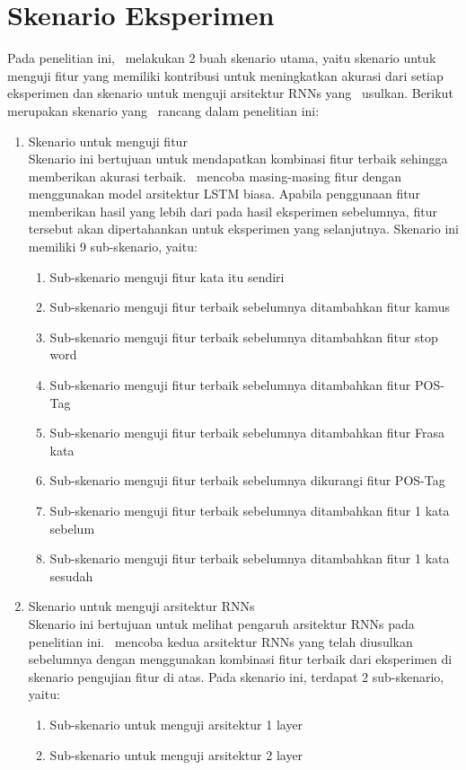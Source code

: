 \section{Skenario Eksperimen}
Pada penelitian ini, \saya~melakukan 2 buah skenario utama, yaitu skenario untuk menguji fitur yang memiliki kontribusi untuk meningkatkan akurasi dari setiap eksperimen dan skenario untuk menguji arsitektur RNNs yang \saya~usulkan. Berikut merupakan skenario yang \saya~rancang dalam penelitian ini:
\begin{enumerate}
	\item Skenario untuk menguji fitur\\
	Skenario ini bertujuan untuk mendapatkan kombinasi fitur terbaik sehingga memberikan akurasi terbaik. \Saya~mencoba masing-masing fitur dengan menggunakan model arsitektur LSTM biasa. Apabila penggunaan fitur memberikan hasil yang lebih dari pada hasil eksperimen sebelumnya, fitur tersebut akan dipertahankan untuk eksperimen yang selanjutnya. Skenario ini memiliki 9 sub-skenario, yaitu:
	\begin{enumerate}
		\item Sub-skenario menguji fitur kata itu sendiri
		\item Sub-skenario menguji fitur terbaik sebelumnya ditambahkan fitur kamus
		\item Sub-skenario menguji fitur terbaik sebelumnya ditambahkan fitur stop word
		\item Sub-skenario menguji fitur terbaik sebelumnya ditambahkan fitur POS-Tag
		\item Sub-skenario menguji fitur terbaik sebelumnya ditambahkan fitur Frasa kata
		\item Sub-skenario menguji fitur terbaik sebelumnya dikurangi fitur POS-Tag
		\item Sub-skenario menguji fitur terbaik sebelumnya ditambahkan fitur 1 kata sebelum
		\item Sub-skenario menguji fitur terbaik sebelumnya ditambahkan fitur 1 kata sesudah
	\end{enumerate}
	\item Skenario untuk menguji arsitektur RNNs\\
	Skenario ini bertujuan untuk melihat pengaruh arsitektur RNNs pada penelitian ini. \Saya~mencoba kedua arsitektur RNNs yang telah diusulkan sebelumnya dengan menggunakan kombinasi fitur terbaik dari eksperimen di skenario pengujian fitur di atas. Pada skenario ini, terdapat 2 sub-skenario, yaitu:
	\begin{enumerate}
		\item Sub-skenario untuk menguji arsitektur 1 layer
		\item Sub-skenario untuk menguji arsitektur 2 layer
	\end{enumerate}
	
\end{enumerate}

